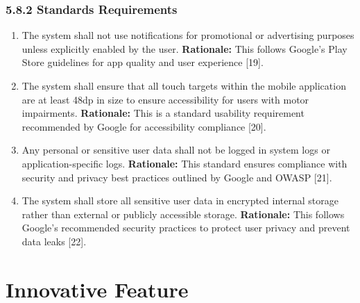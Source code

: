 \documentclass[]{article}
\begin{document}

\subsubsection*{5.8.2 Standards Requirements}
\label{ssub:standards_requirements}
\begin{enumerate}[{LR-STD}1. ]
	\item The system shall not use notifications for promotional or advertising purposes unless explicitly enabled by the user. 
    \newline \textbf{Rationale:} This follows Google’s Play Store guidelines for app quality and user experience [19].

    \item The system shall ensure that all touch targets within the mobile application are at least 48dp in size to ensure accessibility for users with motor impairments. 
    \newline \textbf{Rationale:} This is a standard usability requirement recommended by Google for accessibility compliance [20].

    \item Any personal or sensitive user data shall not be logged in system logs or application-specific logs. 
    \newline \textbf{Rationale:} This standard ensures compliance with security and privacy best practices outlined by Google and OWASP [21].

    \item The system shall store all sensitive user data in encrypted internal storage rather than external or publicly accessible storage. 
    \newline \textbf{Rationale:} This follows Google’s recommended security practices to protect user privacy and prevent data leaks [22]. 
\end{enumerate}




\section{Innovative Feature}
\label{sec:innovative-feature}
\end{document}
